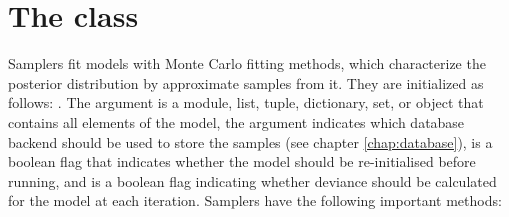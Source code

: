 \section[The Sampler class]{The  class} \label{sec:Sampler}
Samplers fit models with Monte Carlo fitting methods, which characterize the posterior distribution by approximate samples from it. They are initialized as follows: . The  argument is a module, list, tuple, dictionary, set, or object that contains all elements of the model, the  argument indicates which database backend should be used to store the samples (see chapter \ref{chap:database}),  is a boolean flag that indicates whether the model should be re-initialised before running, and  is a boolean flag indicating whether deviance should be calculated for the model at each iteration. Samplers have the following important methods:
